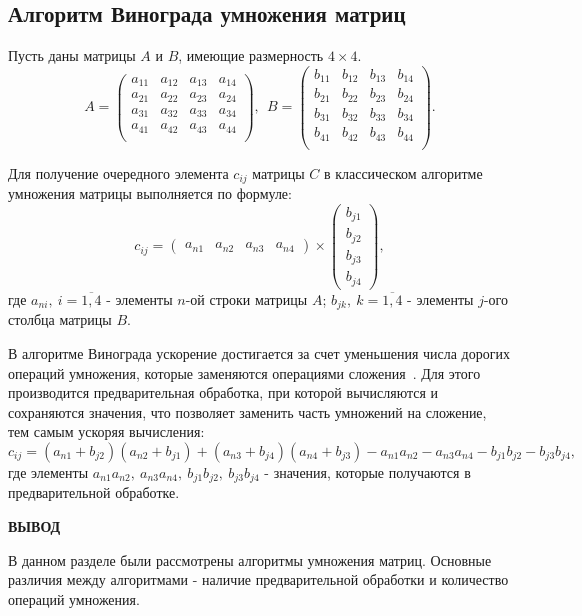 \subsection{Алгоритм Винограда умножения матриц}

Пусть даны матрицы $A$ и  $B$, имеющие размерность  $4\times 4$.
\begin{equation}
    A = 
\begin{pmatrix}
    a_{11} & a_{12} & a_{13} & a_{14} \\
    a_{21} & a_{22} & a_{23} & a_{24} \\
    a_{31} & a_{32} & a_{33} & a_{34} \\
    a_{41} & a_{42} & a_{43} & a_{44} \\
\end{pmatrix}, \ \
    B = 
\begin{pmatrix}
    b_{11} & b_{12} & b_{13} & b_{14} \\
    b_{21} & b_{22} & b_{23} & b_{24} \\
    b_{31} & b_{32} & b_{33} & b_{34} \\
    b_{41} & b_{42} & b_{43} & b_{44} \\
\end{pmatrix}.
\end{equation}

Для получение очередного элемента $c_{ij}$ матрицы $C$ в классическом
алгоритме умножения матрицы выполняется по формуле:
\begin{equation}
    c_{ij} = \begin{pmatrix} a_{n1} & a_{n2} & a_{n3} & a_{n4} \end{pmatrix} 
    \times 
    \begin{pmatrix} b_{j1}\\ b_{j2}\\ b_{j3}\\ b_{j4} \end{pmatrix},
\end{equation}
где $a_{ni}, \ i = \overline{1,4}$ - элементы $n$-ой строки матрицы  $A$;
$b_{jk}, \ k = \overline{1,4}$ - элементы $j$-ого столбца матрицы  $B$.

В алгоритме Винограда ускорение достигается за счет уменьшения числа дорогих операций умножения, которые заменяются операциями сложения~\cite{Vinograd}. Для этого производится предварительная обработка, при которой вычисляются и сохраняются значения, что позволяет заменить часть умножений на сложение, тем самым ускоряя вычисления:
\begin{equation}
    c_{ij} = (a_{n1} + b_{j2}) (a_{n2} + b_{j1})
    + (a_{n3} + b_{j4})(a_{n4} + b_{j 3})
    - a_{n 1}a_{n 2} - a_{n 3}a_{n 4} - b_{j 1}b_{j 2} - b_{j 3}b_{j 4},
\end{equation}
где элементы $a_{n 1}a_{n 2}, \ a_{n 3}a_{n 4}, \ b_{j 1}b_{j 2}, \ b_{j 3}b_{j 4}$ - значения,
которые получаются в предварительной обработке.

\vspace{5mm}

\textbf{ВЫВОД}

В данном разделе были рассмотрены алгоритмы умножения матриц. Основные различия между
алгоритмами - наличие предварительной обработки и количество операций умножения.